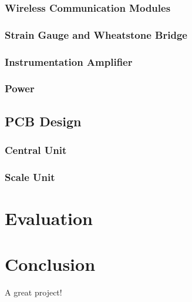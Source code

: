 \documentclass{l3proj}
\begin{document}
\subsection{Wireless Communication Modules}


\subsection{Strain Gauge and Wheatstone Bridge}




\subsection{Instrumentation Amplifier}
\label{ina}


\subsection{Power}


\section{PCB Design}
\label{pcb}


\subsection{Central Unit}


\subsection{Scale Unit}

\chapter{Evaluation}

\chapter{Conclusion}

A great project!

\end{document}
